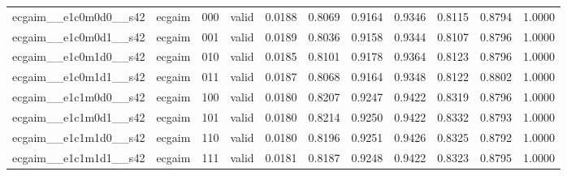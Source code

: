 \begin{tabular}{llllrrrrrrr}
ecgaim__e1c0m0d0__s42 & ecgaim & 000 & valid & 0.0188 & 0.8069 & 0.9164 & 0.9346 & 0.8115 & 0.8794 & 1.0000 \\
ecgaim__e1c0m0d1__s42 & ecgaim & 001 & valid & 0.0189 & 0.8036 & 0.9158 & 0.9344 & 0.8107 & 0.8796 & 1.0000 \\
ecgaim__e1c0m1d0__s42 & ecgaim & 010 & valid & 0.0185 & 0.8101 & 0.9178 & 0.9364 & 0.8123 & 0.8796 & 1.0000 \\
ecgaim__e1c0m1d1__s42 & ecgaim & 011 & valid & 0.0187 & 0.8068 & 0.9164 & 0.9348 & 0.8122 & 0.8802 & 1.0000 \\
ecgaim__e1c1m0d0__s42 & ecgaim & 100 & valid & 0.0180 & 0.8207 & 0.9247 & 0.9422 & 0.8319 & 0.8796 & 1.0000 \\
ecgaim__e1c1m0d1__s42 & ecgaim & 101 & valid & 0.0180 & 0.8214 & 0.9250 & 0.9422 & 0.8332 & 0.8793 & 1.0000 \\
ecgaim__e1c1m1d0__s42 & ecgaim & 110 & valid & 0.0180 & 0.8196 & 0.9251 & 0.9426 & 0.8325 & 0.8792 & 1.0000 \\
ecgaim__e1c1m1d1__s42 & ecgaim & 111 & valid & 0.0181 & 0.8187 & 0.9248 & 0.9422 & 0.8323 & 0.8795 & 1.0000 \\
\bottomrule
\end{tabular}
